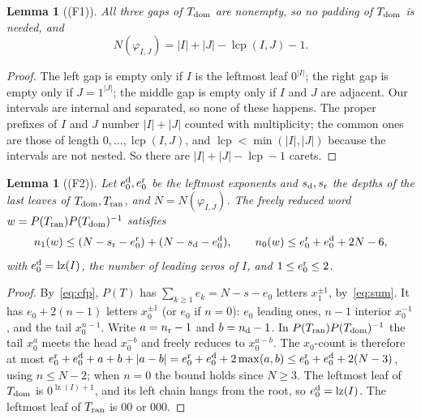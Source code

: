 \documentclass[11pt]{article}
\newtheorem{lemma}[theorem]{Lemma}
\theoremstyle{definition}
\theoremstyle{remark}
\newcommand{\lz}{\operatorname{lz}}
\newcommand{\lcp}{\operatorname{lcp}}
\begin{document}
\begin{lemma}[(F1)]\label{lem:F1}
All three gaps of $T_{\rm dom}$ are nonempty, so no padding of $T_{\rm dom}$ is needed, and
\[ N(\varphi_{I,J})=|I|+|J|-\lcp(I,J)-1 .\]
\end{lemma}
\begin{proof}
The left gap is empty only if $I$ is the leftmost leaf $0^{|I|}$; the right gap is empty only if
$J=1^{|J|}$; the middle gap is empty only if $I$ and $J$ are adjacent. Our intervals are internal
and separated, so none of these happens. The proper prefixes of $I$ and $J$ number $|I|+|J|$
counted with multiplicity; the common ones are those of length $0,\dots,\lcp(I,J)$, and
$\lcp<\min(|I|,|J|)$ because the intervals are not nested. So there are $|I|+|J|-\lcp-1$ carets.
\end{proof}

\begin{lemma}[(F2)]\label{lem:F2}
Let $e^{\rm d}_0,e^{\rm r}_0$ be the leftmost exponents and $s_{\rm d},s_{\rm r}$ the depths of
the last leaves of $T_{\rm dom},T_{\rm ran}$, and $N=N(\varphi_{I,J})$. The freely reduced word
$w=P(T_{\rm ran})P(T_{\rm dom})^{-1}$ satisfies
\[
 n_1(w)\le(N-s_{\rm r}-e^{\rm r}_0)+(N-s_{\rm d}-e^{\rm d}_0),\qquad
 n_0(w)\le e^{\rm r}_0+e^{\rm d}_0+2N-6,
\]
with $e^{\rm d}_0=\lz(I)$, the number of leading zeros of $I$, and $1\le e^{\rm r}_0\le2$.
\end{lemma}
\begin{proof}
By~\eqref{eq:cfp}, $P(T)$ has $\sum_{k\ge1}e_k=N-s-e_0$ letters $x_1^{\pm1}$, by~\eqref{eq:sum}.
It has $e_0+2(n-1)$ letters $x_0^{\pm1}$ (or $e_0$ if $n=0$): $e_0$ leading ones, $n-1$ interior
$x_0^{-1}$, and the tail $x_0^{n-1}$. Write $a=n_{\rm r}-1$ and $b=n_{\rm d}-1$. In
$P(T_{\rm ran})P(T_{\rm dom})^{-1}$ the tail $x_0^{a}$ meets the head $x_0^{-b}$ and freely reduces
to $x_0^{a-b}$. The $x_0$-count is therefore at most
$e^{\rm r}_0+e^{\rm d}_0+a+b+|a-b|=e^{\rm r}_0+e^{\rm d}_0+2\max(a,b)\le e^{\rm r}_0+e^{\rm d}_0+2(N-3)$,
using $n\le N-2$; when $n=0$ the bound holds since $N\ge3$. The leftmost leaf of $T_{\rm dom}$ is
$0^{\lz(I)+1}$, and its left chain hangs from the root, so $e^{\rm d}_0=\lz(I)$. The leftmost leaf
of $T_{\rm ran}$ is $00$ or $000$.
\end{proof}
\end{document}
